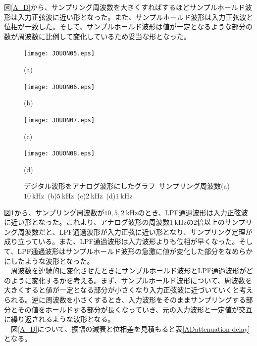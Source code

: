 \documentclass[a4paper,10.5pt]{ltjsarticle}
\begin{document}
図\ref{A_D}から、サンプリング周波数を大きくすればするほどサンプルホールド波形は入力正弦波に近い形となった。また、サンプルホールド波形は入力正弦波と位相が一致した。そして、サンプルホールド波形は値が一定となるような部分の数が周波数に比例して変化しているため妥当な形となった。
\clearpage
\begin{figure}[h]
  \centering
  \begin{minipage}[h]{0.45\linewidth}
    \texttt{[image: JOUON05.eps]}
    \caption*{(a)}
  \end{minipage}
  \begin{minipage}[h]{0.43\linewidth}
    \texttt{[image: JOUON06.eps]}
    \caption*{(b)}
  \end{minipage}
  \begin{minipage}[h]{0.45\linewidth}
    \texttt{[image: JOUON07.eps]}
    \caption*{(c)}
  \end{minipage}
  \begin{minipage}[h]{0.43\linewidth}
    \texttt{[image: JOUON08.eps]}
    \caption*{(d)}
  \end{minipage}
  \caption{デジタル波形をアナログ波形にしたグラフ\ サンプリング周波数(a)$10\ \mathrm{kHz}$\ (b)$5\ \mathrm{kHz}$\ (c)$2\ \mathrm{kHz}$\ (d)$1\ \mathrm{kHz}$}
  \label{D_A}
\end{figure}
図\ref{D_A}から、サンプリング周波数が$10,5,2\ \mathrm{kHz}$のとき、LPF通過波形は入力正弦波に近い形となった。これより、アナログ波形の周波数$1\ \mathrm{kHz}$の2倍以上のサンプリング周波数だと、LPF通過波形が入力正弦に近い形となり、サンプリング定理が成り立っている。また、LPF通過波形は入力波形よりも位相が早くなった。そして、LPF通過波形はサンプルホールド波形の急激に値が変化した部分をなめらかにしたような波形となった。\\
　周波数を連続的に変化させたときにサンプルホールド波形とLPF通過波形がどのように変化するかを考える。まず、サンプルホールド波形について、周波数を大きくすると値が一定となる部分が小さくなり入力正弦波に近づいていくと考えられる。逆に周波数を小さくするとき、入力波形をそのままサンプリングする部分とその値をホールドする部分が長くなっていき、元の入力波形と一定値が交互に繰り返されるような波形となる。\\
　図\ref{A_D}について、振幅の減衰と位相差を見積もると表\ref{ADattenuation-delay}となる。
\end{document}
